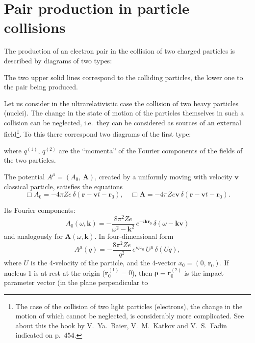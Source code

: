 
\section{Pair production in particle collisions}


The production of an electron pair in the collision of two charged particles is described by diagrams of two types:


The two upper solid lines correspond to the colliding particles, the lower one to the pair being produced.

Let us consider in the ultrarelativistic case the collision of two heavy particles (nuclei). The change in the state of motion of the particles themselves in such a collision can be neglected, i.e.\ they can be considered as sources of an external field\footnote{The case of the collision of two light particles (electrons), the change in the motion of which cannot be neglected, is considerably more complicated. See about this the book by V.~Ya.~Baier, V.~M.~Katkov and V.~S.~Fadin indicated on p.~454.}. To this there correspond two diagrams of the first type:


where $q^{(1)}$, $q^{(2)}$ are the ``momenta'' of the Fourier components of the fields of the two particles.

The potential $A^\mu = (A_0,\,\mathbf{A})$, created by a uniformly moving with velocity $\mathbf{v}$ classical particle, satisfies the equations
\[
\Box A_0 = -4\pi Ze\,\delta(\mathbf{r} - \mathbf{v}t - \mathbf{r}_0), \quad \Box\mathbf{A} = -4\pi Ze\mathbf{v}\,\delta(\mathbf{r} - \mathbf{v}t - \mathbf{r}_0).
\]

Its Fourier components:
\[
A_0(\omega,\mathbf{k}) = -\frac{8\pi^2 Ze}{\omega^2 - \mathbf{k}^2}\,e^{-i\mathbf{k}\mathbf{r}_0}\,\delta(\omega - \mathbf{k}\mathbf{v})
\]
and analogously for $\mathbf{A}(\omega,\mathbf{k})$. In four-dimensional form
\[
A^\mu(q) = -\frac{8\pi^2 Ze}{q^2}\,e^{iqx_0}\,U^\mu\,\delta(Uq),
\]
where $U$ is the 4-velocity of the particle, and the 4-vector $x_0 = (0,\,\mathbf{r}_0)$. If nucleus 1 is at rest at the origin ($\mathbf{r}_0^{(1)} = 0$), then $\boldsymbol{\rho} \equiv \mathbf{r}_0^{(2)}$ is the impact parameter vector (in the plane perpendicular to
